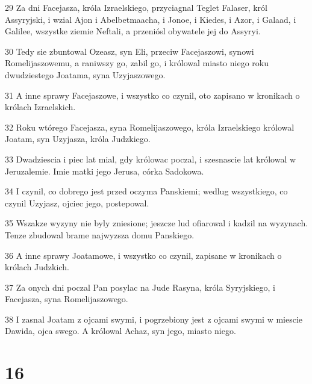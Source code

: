\par 29 Za dni Facejasza, króla Izraelskiego, przyciagnal Teglet Falaser, król Assyryjski, i wzial Ajon i Abelbetmaacha, i Jonoe, i Kiedes, i Azor, i Galaad, i Galilee, wszystke ziemie Neftali, a przeniósl obywatele jej do Assyryi.
\par 30 Tedy sie zbuntowal Ozeasz, syn Eli, przeciw Facejaszowi, synowi Romelijaszowemu, a raniwszy go, zabil go, i królowal miasto niego roku dwudziestego Joatama, syna Uzyjaszowego.
\par 31 A inne sprawy Facejaszowe, i wszystko co czynil, oto zapisano w kronikach o królach Izraelskich.
\par 32 Roku wtórego Facejasza, syna Romelijaszowego, króla Izraelskiego królowal Joatam, syn Uzyjasza, króla Judzkiego.
\par 33 Dwadziescia i piec lat mial, gdy królowac poczal, i szesnascie lat królowal w Jeruzalemie. Imie matki jego Jerusa, córka Sadokowa.
\par 34 I czynil, co dobrego jest przed oczyma Panskiemi; wedlug wszystkiego, co czynil Uzyjasz, ojciec jego, postepowal.
\par 35 Wszakze wyzyny nie byly zniesione; jeszcze lud ofiarowal i kadzil na wyzynach. Tenze zbudowal brame najwyzsza domu Panskiego.
\par 36 A inne sprawy Joatamowe, i wszystko co czynil, zapisane w kronikach o królach Judzkich.
\par 37 Za onych dni poczal Pan posylac na Jude Rasyna, króla Syryjskiego, i Facejasza, syna Romelijaszowego.
\par 38 I zasnal Joatam z ojcami swymi, i pogrzebiony jest z ojcami swymi w miescie Dawida, ojca swego. A królowal Achaz, syn jego, miasto niego.

\chapter{16}

